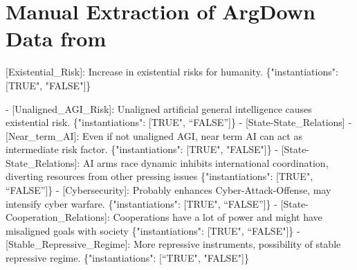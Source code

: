 \documentclass[
  11pt,
  letterpaper,
  openany]{book}
\newenvironment{Shaded}{\begin{snugshade}}{\end{snugshade}}
\newcommand{\DataTypeTok}[1]{\textcolor[rgb]{0.68,0.00,0.00}{#1}}
\newcommand{\ErrorTok}[1]{\textcolor[rgb]{0.68,0.00,0.00}{#1}}
\newcommand{\FunctionTok}[1]{\textcolor[rgb]{0.28,0.35,0.67}{#1}}
\newcommand{\OtherTok}[1]{\textcolor[rgb]{0.00,0.23,0.31}{#1}}
\newcommand{\StringTok}[1]{\textcolor[rgb]{0.13,0.47,0.30}{#1}}
\begin{document}
\chapter{\texorpdfstring{Manual Extraction of ArgDown Data from
\textcite{bucknall2022}}{Manual Extraction of ArgDown Data from @bucknall2022}}\label{sec-bucknall2022}

\begin{Shaded}
\begin{Highlighting}[]
\OtherTok{[}\ErrorTok{Existential\_Risk}\OtherTok{]}\ErrorTok{:} \ErrorTok{Increase} \ErrorTok{in} \ErrorTok{existential} \ErrorTok{risks} \ErrorTok{for} \ErrorTok{humanity.} \FunctionTok{\{}\DataTypeTok{"instantiations"}\FunctionTok{:} \OtherTok{[}\ErrorTok{TRUE}\StringTok{", "}\ErrorTok{FALSE}\StringTok{"]\}}

\StringTok{{-} [Unaligned\_AGI\_Risk]: Unaligned artificial general intelligence causes existential risk. \{"}\ErrorTok{instantiations}\StringTok{": [TRUE"}\OtherTok{,} \ErrorTok{“FALSE”}\OtherTok{]}\FunctionTok{\}}
  \ErrorTok{{-}} \OtherTok{[}\ErrorTok{State{-}State\_Relations}\OtherTok{]}
\ErrorTok{{-}} \OtherTok{[}\ErrorTok{Near\_term\_AI}\OtherTok{]}\ErrorTok{:} \ErrorTok{Even} \ErrorTok{if} \ErrorTok{not} \ErrorTok{unaligned} \ErrorTok{AGI,} \ErrorTok{near} \ErrorTok{term} \ErrorTok{AI} \ErrorTok{can} \ErrorTok{act} \ErrorTok{as} \ErrorTok{intermediate} \ErrorTok{risk} \ErrorTok{factor.} \FunctionTok{\{}\DataTypeTok{"instantiations"}\FunctionTok{:} \OtherTok{[}\ErrorTok{TRUE}\StringTok{", "}\ErrorTok{FALSE}\StringTok{"]\}}
\StringTok{  {-} [State{-}State\_Relations]: AI arms race dynamic inhibits international coordination, diverting resources from other pressing issues \{"}\ErrorTok{instantiations}\StringTok{": [TRUE"}\OtherTok{,} \ErrorTok{“FALSE”}\OtherTok{]}\FunctionTok{\}}
    \ErrorTok{{-}} \OtherTok{[}\ErrorTok{Cybersecurity}\OtherTok{]}\ErrorTok{:} \ErrorTok{Probably} \ErrorTok{enhances} \ErrorTok{Cyber{-}Attack{-}Offense,} \ErrorTok{may} \ErrorTok{intensify} \ErrorTok{cyber} \ErrorTok{warfare.} \FunctionTok{\{}\DataTypeTok{"instantiations"}\FunctionTok{:} \OtherTok{[}\ErrorTok{TRUE}\StringTok{", “FALSE”]\}}
\StringTok{  {-} [State{-}Cooperation\_Relations]: Cooperations have a lot of power and might have misaligned goals with society \{"}\ErrorTok{instantiations}\StringTok{": [TRUE"}\OtherTok{,} \ErrorTok{“FALSE}\StringTok{"]\}}
\StringTok{  {-} [Stable\_Repressive\_Regime]: More repressive instruments, possibility of stable repressive regime. \{"}\ErrorTok{instantiations}\StringTok{": [“TRUE"}\OtherTok{,} \StringTok{"FALSE"}\OtherTok{]}\FunctionTok{\}}

\end{Highlighting}
\end{Shaded}
\end{document}
